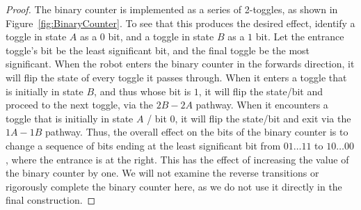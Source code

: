 \begin{proof}

The binary counter is implemented as a series of 2-toggles, as shown in Figure~\ref{fig:BinaryCounter}.
To see that this produces the desired effect, identify a toggle in state $A$ as a $0$ bit, and a toggle in state
$B$ as a $1$ bit. Let the entrance toggle's bit be the least significant bit, and the final toggle be the
most significant. When the robot enters the binary counter in the forwards direction, it will flip
the state of every toggle it passes through. When it enters a toggle that is initially in state $B$, and thus whose
bit is $1$, it will flip the state/bit and proceed to the next toggle, via the $2B - 2A$ pathway. When it
encounters a toggle that is initially in state $A$ / bit $0$, it will flip the state/bit and exit via the $1A - 1B$
pathway. Thus, the overall effect on the bits of the binary counter is to change a sequence of bits ending at the
least significant bit from $01\ldots11$ to $10\ldots00$, where the entrance is at the right.
This has the effect of increasing the value of the binary counter by one.
We will not examine the reverse transitions or rigorously complete the binary counter here, 
as we do not use it directly in the final construction. 




\end{proof}
